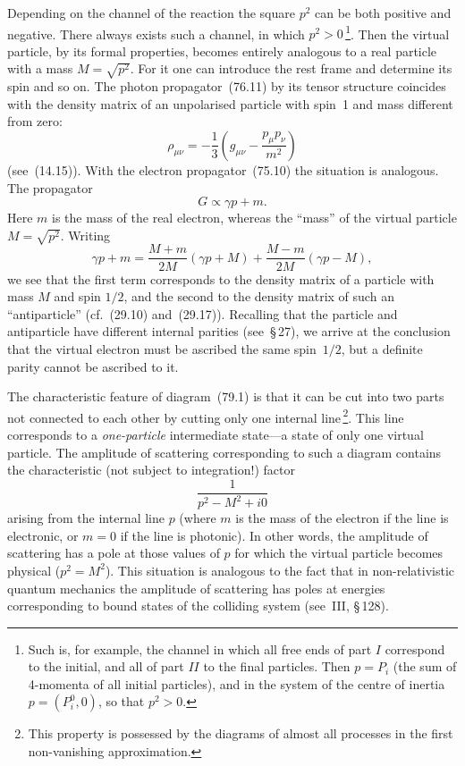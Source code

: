 Depending on the channel of the reaction the square $p^2$ can be both positive and negative. There always exists such a channel, in which $p^2 > 0$\,\footnote{Such is, for example, the channel in which all free ends of part $I$ correspond to the initial, and all of part $II$ to the final particles. Then $p = P_i$ (the sum of 4-momenta of all initial particles), and in the system of the centre of inertia $p = (P_i^0, 0)$, so that $p^2 > 0$.}. Then the virtual particle, by its formal properties, becomes entirely analogous to a real particle with a mass $M = \sqrt{p^2}$. For it one can introduce the rest frame and determine its spin and so on. The photon propagator~(76.11) by its tensor structure coincides with the density matrix of an unpolarised particle with spin~1 and mass different from zero:
\[
\rho_{\mu\nu} = -\frac{1}{3}\left(g_{\mu\nu} - \frac{p_\mu p_\nu}{m^2}\right)
\]
(see~(14.15)). With the electron propagator~(75.10) the situation is analogous. The propagator
\[
G \propto \gamma p + m.
\]
Here $m$ is the mass of the real electron, whereas the ``mass'' of the virtual particle $M = \sqrt{p^2}$. Writing
\begin{equation}
\gamma p + m = \frac{M + m}{2M}(\gamma p + M) + \frac{M - m}{2M}(\gamma p - M),
\tag{79.2}
\end{equation}
we see that the first term corresponds to the density matrix of a particle with mass $M$ and spin $1/2$, and the second to the density matrix of such an ``antiparticle'' (cf.~(29.10) and~(29.17)). Recalling that the particle and antiparticle have different internal parities (see~\S\,27), we arrive at the conclusion that the virtual electron must be ascribed the same spin~$1/2$, but a definite parity cannot be ascribed to it.

The characteristic feature of diagram~(79.1) is that it can be cut into two parts not connected to each other by cutting only one internal line\,\footnote{This property is possessed by the diagrams of almost all processes in the first non-vanishing approximation.}. This line corresponds to a \textit{one-particle} intermediate state---a state of only one virtual particle. The amplitude of scattering corresponding to such a diagram contains the characteristic (not subject to integration!) factor
\[
\frac{1}{p^2 - M^2 + i0}
\]
arising from the internal line $p$ (where $m$ is the mass of the electron if the line is electronic, or $m = 0$ if the line is photonic). In other words, the amplitude of scattering has a pole at those values of $p$ for which the virtual particle becomes physical ($p^2 = M^2$). This situation is analogous to the fact that in non-relativistic quantum mechanics the amplitude of scattering has poles at energies corresponding to bound states of the colliding system (see~III, \S\,128).

